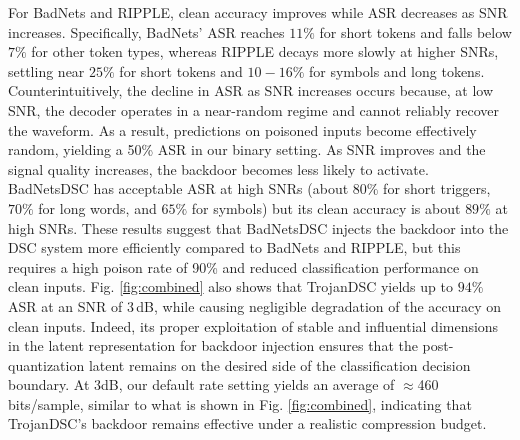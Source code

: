 \documentclass[journal]{IEEEtran}
\begin{document}
{
For BadNets and RIPPLE, clean accuracy improves while ASR decreases as SNR increases. Specifically, BadNets' ASR reaches \(11\%\) for short tokens and falls below \(7\%\) for other token types, whereas RIPPLE decays more slowly at higher SNRs, settling near \(25\%\) for short tokens and \(10\!-\!16\%\) for symbols and long tokens.
Counterintuitively, the decline in ASR as SNR increases occurs because, at low SNR, the decoder operates in a near-random regime and cannot reliably recover the waveform. As a result, predictions on poisoned inputs become effectively random, yielding a 
50\% ASR in our binary setting. As SNR improves and the signal quality increases, the backdoor becomes less likely to activate.}
BadNetsDSC has acceptable ASR at high SNRs (about $80\%$ for short triggers, $70\%$ for long words, and $65\%$ for symbols) but its clean accuracy is about $89\%$ at high SNRs.  
These results suggest that BadNetsDSC 
injects the backdoor into the DSC system more efficiently
compared to BadNets and RIPPLE, but this requires a high poison rate of 90\% and reduced classification performance on clean inputs. Fig. \ref{fig:combined} also shows that TrojanDSC yields up to $94\%$ ASR at an SNR of $3$\,dB, while causing negligible degradation of the accuracy on clean inputs.
Indeed, its proper exploitation of stable and influential dimensions in the latent representation for backdoor injection ensures
that the post-quantization latent remains on the desired side of the classification decision boundary. At $3$dB, our default rate setting yields an average of 
$\approx$460 bits/sample, similar to what is shown in Fig. \ref{fig:combined}, indicating that TrojanDSC’s backdoor remains effective under a realistic compression budget.

\end{document}
